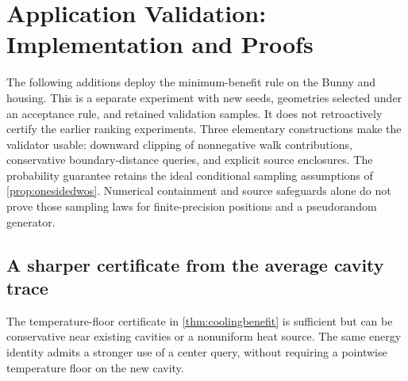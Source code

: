 \section{Application Validation: Implementation and Proofs}
\label{app:applicationcertificate}

The following additions deploy the minimum-benefit rule on the Bunny and
housing. This is a separate experiment with new seeds, geometries selected
under an acceptance rule, and retained validation samples. It does not
retroactively certify the earlier ranking experiments. Three elementary
constructions make the validator usable: downward clipping of nonnegative
walk contributions, conservative boundary-distance queries, and explicit
source enclosures. The probability guarantee retains the ideal conditional
sampling assumptions of \cref{prop:onesidedwos}. Numerical containment and
source safeguards alone do not prove those sampling laws for finite-precision
positions and a pseudorandom generator.

\subsection{A sharper certificate from the average cavity trace}

The temperature-floor certificate in \cref{thm:coolingbenefit} is sufficient
but can be conservative near existing cavities or a nonuniform heat source.
The same energy identity admits a stronger use of a center query, without
requiring a pointwise temperature floor on the new cavity.


